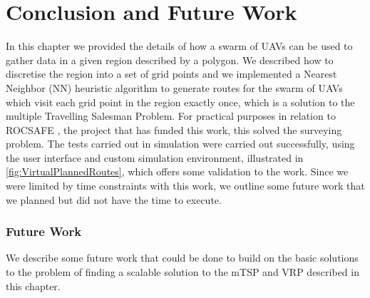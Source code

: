 \section{Conclusion and Future Work}
In this chapter we provided the details of how a swarm of UAVs can be used to gather data in a given region described by a polygon. We described how to discretise the region into a set of grid points and we implemented a Nearest Neighbor (NN) heuristic algorithm to generate routes for the swarm of UAVs which visit each grid point in the region exactly once, which is a solution to the multiple Travelling Salesman Problem. For practical purposes in relation to ROCSAFE \cite{rocsafeNUIG}, the project that has funded this work, this solved the surveying problem. The tests carried out in simulation were carried out successfully, using the user interface and custom simulation environment, illustrated in \ref{fig:VirtualPlannedRoutes}, which offers some validation to the work. Since we were limited by time constraints with this work, we outline some future work that we planned but did not have the time to execute.\par

\subsubsection{Future Work}
We describe some future work that could be done to build on the basic solutions to the problem of finding a scalable solution to the mTSP and VRP described in this chapter. 

